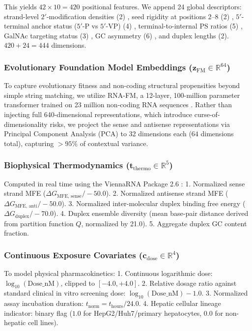 \documentclass[twocolumn]{article}
\begin{document}
This yields $42 \times 10 = 420$ positional features. We append 24 global descriptors: strand-level $2'$-modification densities (2) \cite{allerson2005fully}, seed rigidity at positions 2--8 (2) \cite{bramsen2009large}, $5'$-terminal anchor status ($5'$-P vs $5'$-VP) (4) \cite{schirle2012crystal,parmar2016vinylphosphonate}, terminal-to-internal PS ratios (5) \cite{behlke2008chemical,sakamuri2020serum}, GalNAc targeting status (3) \cite{nair2014multivalent,weingartner2020galnac}, GC asymmetry (6) \cite{reynolds2004rational,khvorova2003functional,schwarz2003asymmetry}, and duplex lengths (2). $420 + 24 = 444$ dimensions.

\subsubsection{Evolutionary Foundation Model Embeddings ($\mathbf{z}_{\text{FM}} \in \mathbb{R}^{64}$)}
To capture evolutionary fitness and non-coding structural propensities beyond simple string matching, we utilize RNA-FM, a 12-layer, 100-million parameter transformer trained on 23 million non-coding RNA sequences \cite{chen2022rnafm}. Rather than injecting full 640-dimensional representations, which introduce curse-of-dimensionality risks, we project the sense and antisense representations via Principal Component Analysis (PCA) to 32 dimensions each ($64$ dimensions total), capturing $>95\%$ of contextual variance.

\subsubsection{Biophysical Thermodynamics ($\mathbf{t}_{\text{thermo}} \in \mathbb{R}^5$)}
Computed in real time using the ViennaRNA Package 2.6 \cite{lorenz2011viennarna}:
1. Normalized sense strand MFE ($\Delta G_{\text{MFE, sense}} / -50.0$).
2. Normalized antisense strand MFE ($\Delta G_{\text{MFE, anti}} / -50.0$).
3. Normalized inter-molecular duplex binding free energy ($\Delta G_{\text{duplex}} / -70.0$).
4. Duplex ensemble diversity (mean base-pair distance derived from partition function $Q$, normalized by 21.0).
5. Aggregate duplex GC content fraction.

\subsubsection{Continuous Exposure Covariates ($\mathbf{c}_{\text{dose}} \in \mathbb{R}^4$)}
To model physical pharmacokinetics:
1. Continuous logarithmic dose: $\log_{10}(\text{Dose\_nM})$, clipped to $[-4.0, +4.0]$.
2. Relative dosage ratio against standard clinical in vitro screening dose: $\log_{10}(\text{Dose\_nM}) - 1.0$.
3. Normalized assay incubation duration: $t_{\text{norm}} = t_{\text{hours}} / 24.0$.
4. Hepatic cellular lineage indicator: binary flag ($1.0$ for HepG2/Huh7/primary hepatocytes, $0.0$ for non-hepatic cell lines).
\end{document}
